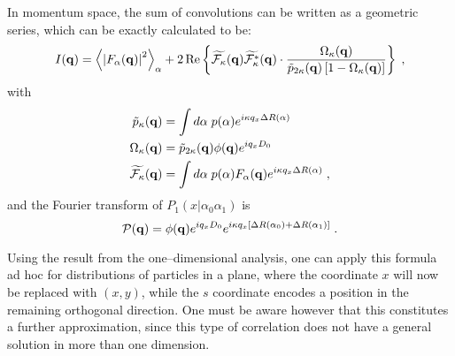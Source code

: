 In momentum space, the sum of convolutions can be written as a geometric series, which can be exactly calculated to be:
\begin{equation}
\label{eq:sscainf}
  I(\mathbf{q} ) = \left\langle \left| F_\alpha(\mathbf{q} ) \right| ^2 \right\rangle_{\alpha}  + 2 \operatorname{Re} \left\lbrace \widetilde{\mathcal{F}_\kappa}(\mathbf{q} )\widetilde{\mathcal{F}_\kappa^*}(\mathbf{q} ) \cdot \frac{\Omega_\kappa(\mathbf{q} )}{\tilde{p}_{2\kappa}(\mathbf{q} )\left[ 1 - \Omega_\kappa(\mathbf{q} )\right] } \right\rbrace \; ,
\end{equation}
with
\begin{align*}
  \tilde{p}_\kappa(\mathbf{q} ) &= \int d\alpha\; p(\alpha) e^{i\kappa q_x \Delta R(\alpha)}  \\
  \Omega_\kappa(\mathbf{q} ) &= \tilde{p}_{2\kappa}(\mathbf{q} ) \phi(\mathbf{q}) e^{i q_x D_0}  \\
  \widetilde{\mathcal{F}_\kappa}(\mathbf{q} ) &= \int d\alpha\; p(\alpha)F_\alpha (\mathbf{q} ) e^{i\kappa q_x \Delta R(\alpha)} \; ,
\end{align*}
and the Fourier transform of $P_1(x|\alpha_0\alpha_1)$ is
\begin{equation*}
  \mathcal{P} (\mathbf{q} ) = \phi (\mathbf{q} )e^{i q_x D_0} e^{i \kappa q_x \left[ \Delta R(\alpha_0) + \Delta R(\alpha_1) \right] } \; .
\end{equation*}

Using the result from the one--dimensional analysis, one can apply this formula ad hoc for distributions of particles in a plane, where the coordinate $x$ will now be replaced with $(x,y)$, while the $s$ coordinate encodes a position in the remaining orthogonal direction. One must be aware however that this constitutes a further approximation, since this type of correlation does not have a general solution in more than one dimension.

